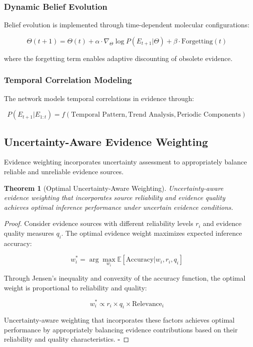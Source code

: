 \documentclass[12pt,a4paper]{article}
\newtheorem{theorem}{Theorem}[section]
\begin{document}
\subsubsection{Dynamic Belief Evolution}

Belief evolution is implemented through time-dependent molecular configurations:

\begin{equation}
\Theta(t+1) = \Theta(t) + \alpha \cdot \nabla_{\Theta} \log P(E_{t+1} | \Theta) + \beta \cdot \text{Forgetting}(t)
\end{equation}

where the forgetting term enables adaptive discounting of obsolete evidence.

\subsubsection{Temporal Correlation Modeling}

The network models temporal correlations in evidence through:

\begin{equation}
P(E_{t+1} | E_{1:t}) = f(\text{Temporal Pattern}, \text{Trend Analysis}, \text{Periodic Components})
\end{equation}

\subsection{Uncertainty-Aware Evidence Weighting}

Evidence weighting incorporates uncertainty assessment to appropriately balance reliable and unreliable evidence sources.

\begin{theorem}[Optimal Uncertainty-Aware Weighting]
Uncertainty-aware evidence weighting that incorporates source reliability and evidence quality achieves optimal inference performance under uncertain evidence conditions.
\end{theorem}

\begin{proof}
Consider evidence sources with different reliability levels $r_i$ and evidence quality measures $q_i$. The optimal evidence weight maximizes expected inference accuracy:

\begin{equation}
w_i^* = \arg\max_{w_i} \mathbb{E}[\text{Accuracy} | w_i, r_i, q_i]
\end{equation}

Through Jensen's inequality and convexity of the accuracy function, the optimal weight is proportional to reliability and quality:

\begin{equation}
w_i^* \propto r_i \times q_i \times \text{Relevance}_i
\end{equation}

Uncertainty-aware weighting that incorporates these factors achieves optimal performance by appropriately balancing evidence contributions based on their reliability and quality characteristics. $\square$
\end{proof}
\end{document}
